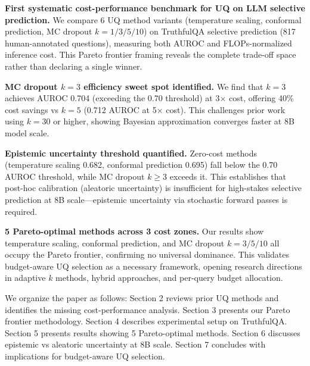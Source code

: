 \textbf{First systematic cost-performance benchmark for UQ on LLM selective prediction.} We compare 6 UQ method variants (temperature scaling, conformal prediction, MC dropout $k=1/3/5/10$) on TruthfulQA selective prediction (817 human-annotated questions), measuring both AUROC and FLOPs-normalized inference cost. This Pareto frontier framing reveals the complete trade-off space rather than declaring a single winner.

\textbf{MC dropout $k=3$ efficiency sweet spot identified.} We find that $k=3$ achieves AUROC 0.704 (exceeding the 0.70 threshold) at 3$\times$ cost, offering 40\% cost savings vs $k=5$ (0.712 AUROC at 5$\times$ cost). This challenges prior work using $k=30$ or higher, showing Bayesian approximation converges faster at 8B model scale.

\textbf{Epistemic uncertainty threshold quantified.} Zero-cost methods (temperature scaling 0.682, conformal prediction 0.695) fall below the 0.70 AUROC threshold, while MC dropout $k\geq3$ exceeds it. This establishes that post-hoc calibration (aleatoric uncertainty) is insufficient for high-stakes selective prediction at 8B scale---epistemic uncertainty via stochastic forward passes is required.

\textbf{5 Pareto-optimal methods across 3 cost zones.} Our results show temperature scaling, conformal prediction, and MC dropout $k=3/5/10$ all occupy the Pareto frontier, confirming no universal dominance. This validates budget-aware UQ selection as a necessary framework, opening research directions in adaptive $k$ methods, hybrid approaches, and per-query budget allocation.

We organize the paper as follows: Section 2 reviews prior UQ methods and identifies the missing cost-performance analysis. Section 3 presents our Pareto frontier methodology. Section 4 describes experimental setup on TruthfulQA. Section 5 presents results showing 5 Pareto-optimal methods. Section 6 discusses epistemic vs aleatoric uncertainty at 8B scale. Section 7 concludes with implications for budget-aware UQ selection.
